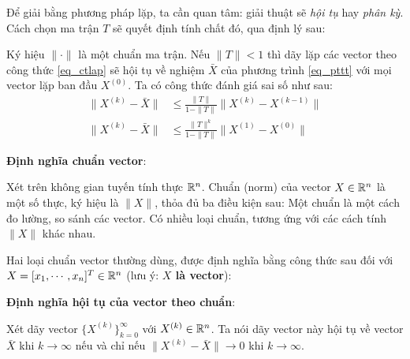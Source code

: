 \documentclass[12pt]{article}
\begin{document}
\newpage{}

Để giải bằng phương pháp lặp, ta cần quan tâm: giải thuật sẽ \emph{hội tụ} hay \emph{phân kỳ}. Cách chọn ma trận $T$ sẽ quyết định tính chất đó, qua định lý sau:
\begin{Thm}
 Ký hiệu $\|\cdot\|$ là một chuẩn ma trận. Nếu $\|T\|<1$ thì dãy lặp các vector theo công thức \eqref{eq_ctlap} sẽ hội tụ về nghiệm $\bar{X}$ của phương trình \eqref{eq_pttt} với mọi vector lặp ban đầu $X^{(0)}$. Ta có công thức đánh giá sai số như sau:
 \begin{align}
 \|X^{(k)} - \bar{X}\| &\leq \frac{\|T\|}{1-\|T\|} \|X^{(k)} - X^{(k-1)}\| \\
 \|X^{(k)} - \bar{X}\| &\leq \frac{\|T\|^k}{1-\|T\|} \|X^{(1)} - X^{(0)}\|
 \end{align}
\end{Thm}

\newpage{}

\textbf{Định nghĩa chuẩn vector}:

Xét trên không gian tuyến tính thực ${\mathbb{R}}^n$. Chuẩn (norm) của vector $X \in {\mathbb{R}}^n$ là một số thực, ký hiệu là $\|X\|$, thỏa đủ ba điều kiện sau:
Một chuẩn là một cách đo lường, so sánh các vector. Có nhiều loại chuẩn, tương ứng với các cách tính $\|X\|$ khác nhau.

\newpage{}

Hai loại chuẩn vector thường dùng, được định nghĩa bằng công thức sau đối với $X=[x_1, \cdots, x_n]^T \in {\mathbb{R}}^n$ (lưu ý: \textbf{$X$ là vector}):

\textbf{Định nghĩa hội tụ của vector theo chuẩn}:

Xét dãy vector $\{X^{(k)}\}_{k=0}^\infty$ với $X^{(k)} \in {\mathbb{R}}^n$. Ta nói dãy vector này hội tụ về vector $\bar{X}$ khi $k \to \infty$ nếu và chỉ nếu $\|X^{(k)}-\bar{X}\| \to 0$ khi $k \to \infty$.
\end{document}
